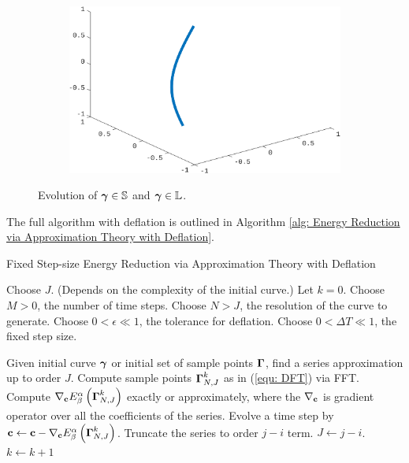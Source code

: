\documentclass[../dissertation.tex]{subfiles}
\begin{document}
\begin{figure}[tbp]
\begin{subfigure}[b]{0.5\textwidth}
    \end{subfigure}
    \begin{subfigure}[b]{0.45\textwidth}
        \centering
        \includegraphics[width=\textwidth]{sections/FourierSeriesImgs/Chebyshev2}
    \end{subfigure}
    \caption{Evolution of $\boldsymbol{\gamma} \in \mathbb{S}$ and $\boldsymbol{\gamma} \in \mathbb{L}$.}
\end{figure}
The full algorithm with deflation is outlined in Algorithm \ref{alg: Energy Reduction via Approximation Theory with Deflation}.

\begin{algorithm}[tbp]
    \caption{Fixed Step-size Energy Reduction via Approximation Theory with Deflation}
    \label{alg: Energy Reduction via Approximation Theory with Deflation}
    \begin{algorithmic}
        \State Choose $J$. (Depends on the complexity of the initial curve.)
        \State Let $k=0$.
        \State Choose $M > 0$, the number of time steps.
        \State Choose $N > J$, the resolution of the curve to generate.
        \State Choose $0 < \epsilon \ll 1$, the tolerance for deflation.
        \State Choose $0 < \Delta T \ll 1$, the fixed step size.

        \State Given initial curve $\boldsymbol{\gamma}$ or initial set of sample points $\boldsymbol{\Gamma}$, find a series approximation up to order $J$.
        \State Compute sample points $\boldsymbol{\Gamma}_{N,J}^k$ as in (\ref{equ: DFT}) via FFT.
        \State Compute $\nabla_{\mathbf{c}} E_{\beta}^{\alpha} \left( \boldsymbol{\Gamma}_{N,J}^k \right)$ exactly or approximately, where the $\nabla_{\mathbf{c}}$ is gradient operator over all the coefficients of the series.
        \State Evolve a time step by $\mathbf{c} \leftarrow \mathbf{c} - \nabla_{\mathbf{c}} E_{\beta}^{\alpha} \left( \boldsymbol{\Gamma}_{N,J}^k \right)$.
        \State Truncate the series to order $j-i$ term.
        \State $J \leftarrow j-i$.
        \EndIf
        \State $k \leftarrow k+1$
        \EndWhile
    \end{algorithmic}
\end{algorithm}
\end{document}
